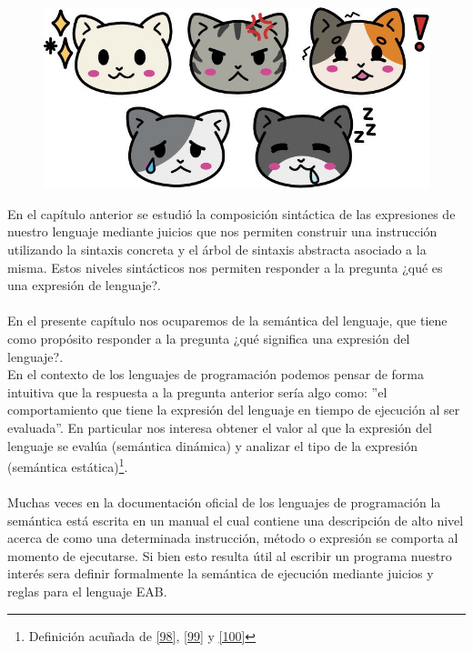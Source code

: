 
\begin{figure}[htbp]
    \centerline{\includegraphics[scale=.4]{assets/04_gatito_semantica.jpg}}       
\end{figure}


\bigskip
\bigskip
\bigskip
\bigskip


    En el capítulo anterior se estudió la composición sintáctica de las expresiones de nuestro lenguaje mediante juicios que nos permiten construir una instrucción utilizando la sintaxis
    concreta y el árbol de sintaxis abstracta asociado a la misma. Estos niveles sintácticos nos permiten responder a la pregunta ¿qué es una expresión de lenguaje?.\\\\
    En el presente capítulo nos ocuparemos de la semántica del lenguaje, que tiene como propósito responder a la pregunta ¿qué significa una expresión del lenguaje?.\\
    En el contexto de los lenguajes de programación podemos pensar de forma intuitiva que la respuesta a la pregunta anterior sería algo como: ''el comportamiento que tiene la expresión del lenguaje en tiempo de ejecución al ser evaluada''. 
    En particular  nos interesa obtener el valor al que la expresión del lenguaje se evalúa (semántica dinámica) y analizar el tipo de la expresión (semántica estática)\footnote{Definición acuñada de \hyperlink{98}{[98]}, \hyperlink{99}{[99]} y \hyperlink{100}{[100]}}.\\\\
    Muchas veces en la documentación oficial de los lenguajes de programación la semántica está escrita en un manual el cual contiene una descripción de alto nivel
    acerca de como una determinada instrucción, método o expresión se comporta al momento de ejecutarse. Si bien esto resulta útil al escribir un programa nuestro interés sera definir formalmente la semántica de ejecución mediante juicios y reglas para el lenguaje \textsf{EAB}. \\

